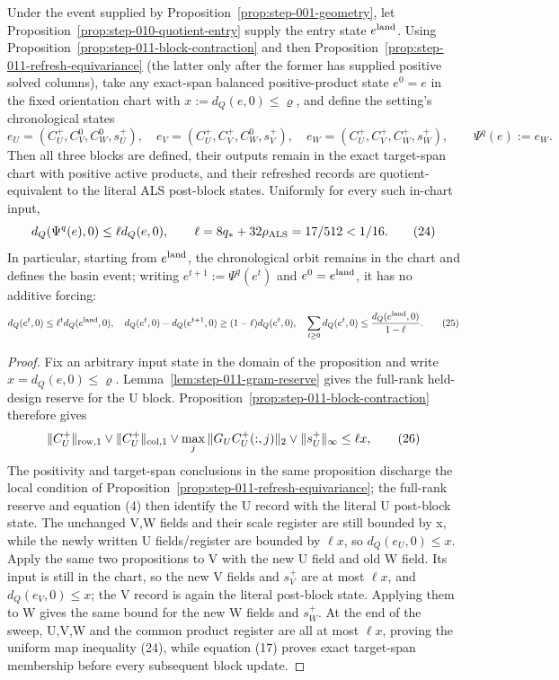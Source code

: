 \begin{proposition}\label{prop:step-011-chronological-contraction}
Under the event supplied by Proposition~\ref{prop:step-001-geometry}, let
Proposition~\ref{prop:step-010-quotient-entry} supply the entry state
\(e^{\rm land}\). Using
Proposition~\ref{prop:step-011-block-contraction} and then
Proposition~\ref{prop:step-011-refresh-equivariance} (the latter only after
the former has supplied positive solved columns), take any exact-span
balanced positive-product state \(e^0=e\) in the fixed orientation chart
with \(x:=d_Q(e,0)\le\varrho\), and define the setting's chronological states
\[
 e_U=(C_U^+,C_V^0,C_W^0,s_U^+),\quad
 e_V=(C_U^+,C_V^+,C_W^0,s_V^+),\quad
 e_W=(C_U^+,C_V^+,C_W^+,s_W^+),
 \qquad \Psi^q(e):=e_W.
\tag{23}
\]
Then all three blocks are defined, their outputs remain in the exact
target-span chart with positive active products, and their refreshed records
are quotient-equivalent to the literal ALS post-block states. Uniformly for
every such in-chart input,
\[
 d_Q(\Psi^q(e),0)\le\ell d_Q(e,0),
 \qquad \ell=8q_*+32\rho_{\rm ALS}=17/512<1/16.
\tag{24}
\]
In particular, starting from \(e^{\rm land}\), the chronological orbit
remains in the chart and defines the basin event; writing
\(e^{t+1}:=\Psi^q(e^t)\) and \(e^0=e^{\rm land}\), it has no additive forcing:
\[
 d_Q(e^t,0)\le\ell^t d_Q(e^{\rm land},0),
 \quad
 d_Q(e^t,0)-d_Q(e^{t+1},0)\ge(1-\ell)d_Q(e^t,0),
 \quad
 \sum_{t\ge0}d_Q(e^t,0)\le{d_Q(e^{\rm land},0)\over1-\ell}.
\tag{25}
\]

\begin{proof}
Fix an arbitrary input state in the domain of the
proposition and write \(x=d_Q(e,0)\le\varrho\). Lemma~\ref{lem:step-011-gram-reserve}
gives the full-rank held-design reserve for the U block. Proposition~\ref{prop:step-011-block-contraction}
therefore gives
\[
  \|C_U^+\|_{\rm row,1}\vee\|C_U^+\|_{\rm col,1}
  \vee\max_j\|G_UC_U^+(:,j)\|_2\vee\|s_U^+\|_\infty
  \le\ell x,
\tag{26}
\]
The positivity and target-span conclusions in the same proposition discharge
the local condition of Proposition~\ref{prop:step-011-refresh-equivariance};
the full-rank reserve and equation (4) then identify the U record with the
literal U post-block state. The unchanged V,W fields and their scale register
are still bounded by x, while the newly written U fields/register are bounded
by \(\ell x\), so \(d_Q(e_U,0)\le x\). Apply
the same two propositions to V with the new U field and old W field. Its input
is still in the chart, so the new V fields and \(s_V^+\) are at most
\(\ell x\), and \(d_Q(e_V,0)\le x\); the V record is again the literal
post-block state. Applying them to W gives the same bound for the new W
fields and \(s_W^+\). At the end of the sweep, U,V,W and the common product
register are all at most \(\ell x\), proving the uniform map inequality
(24), while equation (17) proves exact target-span membership before every
subsequent block update.


\end{proof}
\end{proposition}

